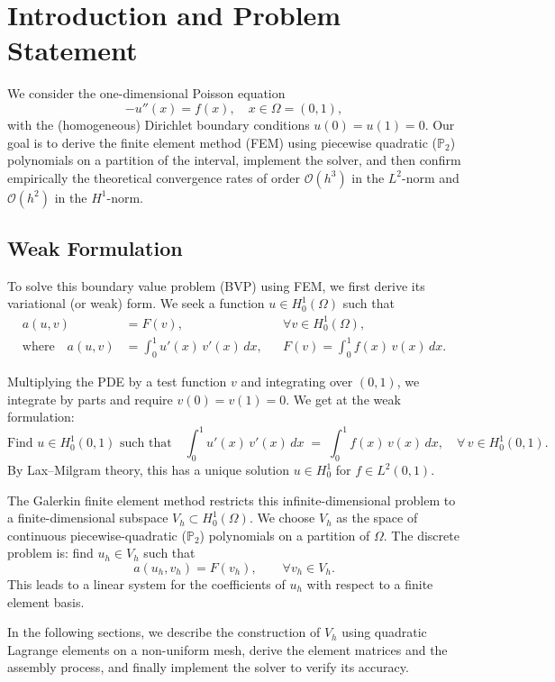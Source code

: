 \documentclass[a4paper,10pt]{article}
\begin{document}

\clearpage

\section{Introduction and Problem Statement}
We consider the one-dimensional Poisson equation
\[
	-u''(x) = f(x), \quad x \in \Omega=(0,1),
\]
with the (homogeneous) Dirichlet boundary conditions \(u(0)=u(1)=0\).
Our goal is to derive the finite element method (FEM) using piecewise quadratic (\(\mathbb{P}_2\)) polynomials on a partition of the interval, implement the solver, and then confirm empirically the theoretical convergence rates of order \(\mathcal{O}(h^3)\) in the \(L^2\)-norm and \(\mathcal{O}(h^2)\) in the \(H^1\)-norm. 

\subsection{Weak Formulation}
To solve this boundary value problem (BVP) using FEM, we first derive its variational (or weak) form.
We seek a function \(u \in H^1_0(\Omega)\) such that
\begin{align}
	a(u,v) &= F(v), && \forall v \in H^1_0(\Omega), \nonumber \\
	\text{where}\quad a(u,v) &= \int_0^1 u'(x)\,v'(x)\,dx, && F(v) = \int_0^1 f(x)\,v(x)\,dx. \label{eq:weak_form}
\end{align}

Multiplying the PDE by a test function \(v\) and integrating over \((0,1)\), we integrate by parts and require \(v(0)=v(1)=0\). 
We get at the weak formulation:
\[
\text{Find } u \in H^1_0(0,1)\text{ such that}\quad
\int_0^1 u'(x)\,v'(x)\,dx \;=\; \int_0^1 f(x)\,v(x)\,dx,
\quad \forall\,v\in H^1_0(0,1).
\]
By Lax--Milgram theory, this has a unique solution \(u\in H^1_0\) for \(f \in L^2(0,1)\).

The Galerkin finite element method restricts this infinite-dimensional problem to a finite-dimensional subspace \(V_h \subset H^1_0(\Omega)\). We choose \(V_h\) as the space of continuous piecewise-quadratic (\(\mathbb{P}_2\)) polynomials on a partition of \(\Omega\). The discrete problem is: find \(u_h \in V_h\) such that
\[
	a(u_h,v_h) = F(v_h), \qquad \forall v_h \in V_h.
\]
This leads to a linear system for the coefficients of \(u_h\) with respect to a finite element basis.

In the following sections, we describe the construction of \(V_h\) using quadratic Lagrange elements on a non-uniform mesh, derive the element matrices and the assembly process, and finally implement the solver to verify its accuracy.
\end{document}
